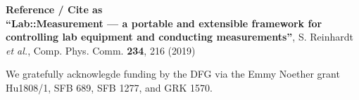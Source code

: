 \documentclass[portrait]{a0poster}
\newcommand{\heading}[1]{
  {\color{heading}\boldmath\textbf{\huge #1}}\\[\medskipamount]
}
\begin{document}
{\begin{minipage}[t][\columnheighta-2\fboxsep-2\fboxrule][t]
\begin{minipage}{\textwidth}
\vspace*{2cm}
\heading{Reference / Cite as}
\textbf{``Lab::Measurement --- a portable and extensible framework for 
controlling lab  equipment and conducting measurements''}, 
S. Reinhardt {\it et al.}, Comp. Phys. Comm. \textbf{234}, 216 (2019)

\end{minipage}
\end{minipage}}  %
%
%
%

\vspace*{0.5cm}
\begin{center}\color{invheading}\large
\hspace*{-4cm}We gratefully acknowlegde funding by the DFG via the Emmy Noether 
grant Hu1808/1, SFB 689, SFB 1277, and GRK 1570.
\end{center}
\end{document}
